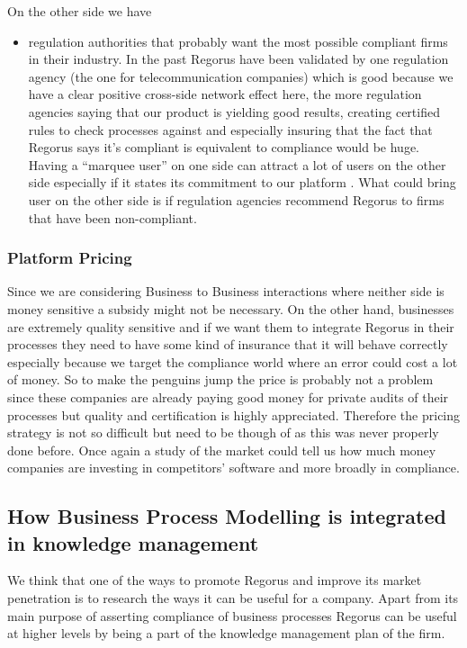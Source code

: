 \documentclass[10pt]{report}
\begin{document}
On the other side we have
\begin{itemize}
\item regulation authorities that probably want the most possible compliant firms in their industry. In the past Regorus have been validated by one regulation agency (the one for telecommunication companies) which is good because we have a clear positive cross-side network effect here, the more regulation agencies saying that our product is yielding good results, creating certified rules to check processes against and especially insuring that the fact that Regorus says it's compliant is equivalent to compliance would be huge. Having a \enquote{marquee user} on one side can attract a lot of users on the other side especially if it states its commitment to our platform \autocite{eisenmann2006strategies}. What could bring user on the other side is if regulation agencies recommend Regorus to firms that have been non-compliant. 
\end{itemize}


\subsubsection{Platform Pricing} Since we are considering Business to Business interactions where neither side is money sensitive a subsidy might not be necessary. On the other hand, businesses are extremely quality sensitive and if we want them to integrate Regorus in their processes they need to have some kind of insurance that it will behave correctly especially because we target the compliance world where an error could cost a lot of money. So to make the penguins jump the price is probably not a problem since these companies are already paying good money for private audits of their processes but quality and certification is highly appreciated. Therefore the pricing strategy is not so difficult but need to be though of as this was never properly done before. Once again a study of the market could tell us how much money companies are investing in competitors' software and more broadly in compliance.




\subsection{How Business Process Modelling is integrated in knowledge management}

We think that one of the ways to promote Regorus and improve its market penetration is to research the ways it can be useful for a company. Apart from its main purpose of asserting compliance of business processes Regorus can be useful at higher levels by being a part of the knowledge management plan of the firm.
\end{document}
